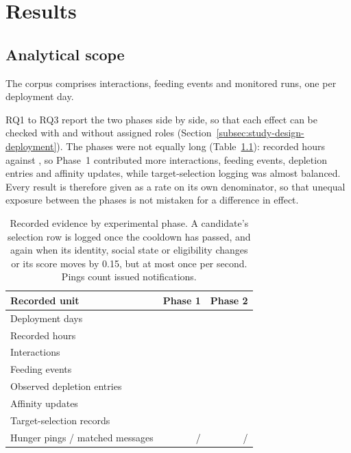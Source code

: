 \chapter{Results}
\label{chap:results}

\section{Analytical scope}
\label{sec:results-data-preparation}

The corpus comprises \CoreInteractions{} interactions, \CoreFeedingEvents{} feeding events and \CoreMonitoredRuns{} monitored runs, one per deployment day.

RQ1 to RQ3 report the two phases side by side, so that each effect can be checked with and without assigned roles (Section~\ref{subsec:study-design-deployment}). The phases were not equally long (Table~\ref{tab:phase-corpus}): \CorePOneRecordedHours{} recorded hours against \CorePTwoRecordedHours{}, so Phase~1 contributed more interactions, feeding events, depletion entries and affinity updates, while target-selection logging was almost balanced. Every result is therefore given as a rate on its own denominator, so that unequal exposure between the phases is not mistaken for a difference in effect.

\begin{table}[htbp]
    \centering
    \small
    \caption[Recorded evidence by experimental phase.]{Recorded evidence by experimental phase. A candidate's selection row is logged once the cooldown has passed, and again when its identity, social state or eligibility changes or its score moves by 0.15, but at most once per second. Pings count issued notifications.}
    \label{tab:phase-corpus}
    \begin{tabular}{@{}lrr@{}}
        \toprule
        \textbf{Recorded unit} & \textbf{Phase 1} & \textbf{Phase 2} \\
        \midrule
        Deployment days & \CorePOneDays{} & \CorePTwoDays{} \\
        Recorded hours & \CorePOneRecordedHours{} & \CorePTwoRecordedHours{} \\
        Interactions & \CorePOneInteractions{} & \CorePTwoInteractions{} \\
        Feeding events & \CorePOneFeedingEvents{} & \CorePTwoFeedingEvents{} \\
        Observed depletion entries & \CorePOneDepletionEntries{} & \CorePTwoDepletionEntries{} \\
        Affinity updates & \CorePOneLearningRecords{} & \CorePTwoLearningRecords{} \\
        Target-selection records & \CorePOneSelectionRecords{} & \CorePTwoSelectionRecords{} \\
        Hunger pings / matched messages & \CorePOnePings{}/\CorePOneMessages{} & \CorePTwoPings{}/\CorePTwoMessages{} \\
        \bottomrule
    \end{tabular}
\end{table}

